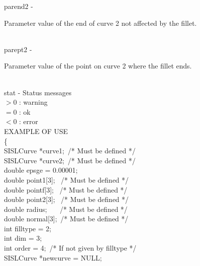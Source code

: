         \>\>    {\fov parend2}  \> - \> \begin{minipg2}
                        Parameter value of the end of curve 2 not affected
                        by the fillet.
                                \end{minipg2}\\[0.8ex]
        \>\>    {\fov parept2}  \> - \> \begin{minipg2}
                        Parameter value of the point on curve 2 where the
                        fillet ends.
                                \end{minipg2}\\[0.8ex]
        \>\>    {\fov stat}     \> - \> Status messages\\
                \>\>\>\>\>              $> 0$   : warning\\
                \>\>\>\>\>              $= 0$   : ok\\
                \>\>\>\>\>              $< 0$   : error\\
\newpagetabs
EXAMPLE OF USE\\
                \>      \{ \\
                \>\>    SISLCurve       \>      *{\fov curve1}; \,/* Must be defined */ \\
                \>\>    SISLCurve       \>      *{\fov curve2}; \,/* Must be defined */ \\
                \>\>    double  \>      {\fov epsge} = 0.00001;\\
                \>\>    double  \>      {\fov point1}[3];  \, /* Must be defined */ \\
                \>\>    double  \>      {\fov pointf}[3];  \, /* Must be defined */\\
                \>\>    double  \>      {\fov point2}[3];  \, /* Must be defined */\\
                \>\>    double  \>      {\fov radius};  \, \, \, /* Must be defined */\\
                \>\>    double  \>      {\fov normal}[3];  \,/* Must be defined */\\
                \>\>    int     \>      {\fov filltype} = 2;\\
                \>\>    int     \>      {\fov dim} = 3;\\
                \>\>    int     \>      {\fov order} = 4; \,/* If not given by filltype */\\
                \>\>    SISLCurve       \>      *{\fov newcurve} = NULL;\\
